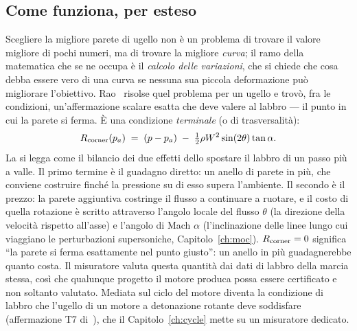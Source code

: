 \subsection{Come funziona, per esteso}

Scegliere la migliore parete di ugello non è un problema di trovare
il valore migliore di pochi numeri, ma di trovare la migliore
\emph{curva}; il ramo della matematica che se ne occupa è il
\emph{calcolo delle variazioni}, che si chiede che cosa debba essere
vero di una curva se nessuna sua piccola deformazione può migliorare
l'obiettivo. Rao~\cite{rao} risolse quel problema per un ugello e
trovò, fra le condizioni, un'affermazione scalare esatta che deve
valere al labbro --- il punto in cui la parete si ferma. È una
condizione \emph{terminale} (o di trasversalità):
\begin{equation}
R_{\rm corner}(p_a) \;=\; (p - p_a)\;-\;\tfrac{1}{2}\rho W^{2}
\sin(2\theta)\tan\alpha .
\label{eq:corner}
\end{equation}
La si legga come il bilancio dei due effetti dello spostare il
labbro di un passo più a valle. Il primo termine è il guadagno
diretto: un anello di parete in più, che conviene costruire finché
la pressione su di esso supera l'ambiente. Il secondo è il prezzo:
la parete aggiuntiva costringe il flusso a continuare a ruotare, e
il costo di quella rotazione è scritto attraverso l'angolo locale
del flusso $\theta$ (la direzione della velocità rispetto all'asse)
e l'angolo di Mach $\alpha$ (l'inclinazione delle linee lungo cui
viaggiano le perturbazioni supersoniche,
Capitolo~\ref{ch:moc}). $R_{\rm corner} = 0$ significa ``la parete
si ferma esattamente nel punto giusto'': un anello in più
guadagnerebbe quanto costa. Il misuratore valuta questa quantità dai
dati di labbro della marcia stessa, così che qualunque progetto il
motore produca possa essere certificato e non soltanto valutato.
Mediata sul ciclo del motore diventa la condizione di labbro che
l'ugello di un motore a detonazione rotante deve soddisfare
(affermazione T7 di~\cite{theory}), che il Capitolo~\ref{ch:cycle}
mette su un misuratore dedicato.

